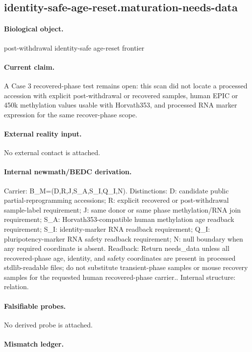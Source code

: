 \subsection{identity-safe-age-reset.maturation-needs-data}

\paragraph{Biological object.} post-withdrawal identity-safe age-reset frontier

\paragraph{Current claim.} A Case 3 recovered-phase test remains open: this scan did not locate a processed accession with explicit post-withdrawal or recovered samples, human EPIC or 450k methylation values usable with Horvath353, and processed RNA marker expression for the same recover-phase scope.

\paragraph{External reality input.}
No external contact is attached.

\paragraph{Internal newmath/BEDC derivation.} Carrier: B\_M=(D,R,J,S\_A,S\_I,Q\_I,N). Distinctions: D: candidate public partial-reprogramming accessions; R: explicit recovered or post-withdrawal sample-label requirement; J: same donor or same phase methylation/RNA join requirement; S\_A: Horvath353-compatible human methylation age readback requirement; S\_I: identity-marker RNA readback requirement; Q\_I: pluripotency-marker RNA safety readback requirement; N: null boundary when any required coordinate is absent. Readback: Return needs\_data unless all recovered-phase age, identity, and safety coordinates are present in processed stdlib-readable files; do not substitute transient-phase samples or mouse recovery samples for the requested human recovered-phase carrier.. Internal structure: relation.

\paragraph{Falsifiable probes.}
No derived probe is attached.

\paragraph{Mismatch ledger.}
